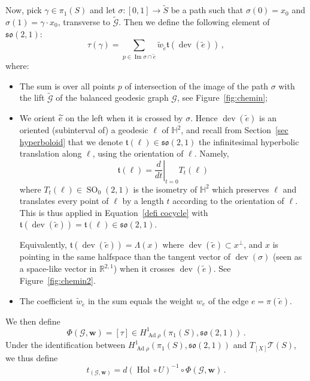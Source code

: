 \documentclass[11pt]{article}
\theoremstyle{definition}
\numberwithin{equation}{section}
\numberwithin{figure}{section}
\numberwithin{table}{section}
\newcommand{\Teich}{\mathcal{T}}
\newcommand{\Hyp}{\mathbb{H}}
\newcommand{\R}{{\mathbb R}}
\newcommand{\so}{\mathfrak{so}}
\DeclareMathOperator{\dev}{dev}
\DeclareMathOperator{\Ad}{Ad}
\DeclareMathOperator{\Hol}{Hol}
\DeclareMathOperator{\SO}{SO}
\DeclareMathOperator{\Imm}{Im}
\let\oldtilde\tilde
\renewcommand*{\tilde}[1]{\mathchoice{\widetilde{#1}}{\widetilde{#1}}{\oldtilde{#1}}{\oldtilde{#1}}}\let\oldhat\hat
\renewcommand*{\hat}[1]{\mathchoice{\widehat{#1}}{\widehat{#1}}{\oldhat{#1}}{\oldhat{#1}}}
\begin{document}
Now, pick $\gamma\in\pi_1(S)$ and let $\sigma:[0,1]\to\widetilde S$ be a path such that $\sigma(0)=x_0$ and $\sigma(1)=\gamma\cdot x_0$, transverse to $\widetilde{\mathcal{G}}$. Then we define the following element of $\so(2,1)$:
\begin{equation}\label{defi cocycle}
\tau(\gamma)=\sum_{p\in \Imm\sigma\cap \widetilde e} \widetilde w_{\widetilde e} \mathfrak t(\dev(\widetilde e))\,,
\end{equation}
where:
\begin{itemize}
\item The sum is over all points $p$ of intersection of the image of the path $\sigma$ with the lift $\widetilde{\mathcal{G}}$ of the balanced geodesic graph $\mathcal{G}$, see Figure~\ref{fig:chemin};
\item We orient $\tilde{e}$ on the left when it is crossed by $\sigma$. Hence $\dev(\widetilde e)$ is an oriented (subinterval of) a geodesic $\ell$ of $\Hyp^2$, and recall from Section~\ref{sec hyperboloid} that we denote $\mathfrak t(\ell)\in\so(2,1)$ the infinitesimal hyperbolic translation along $\ell$, using the orientation of $\ell$. Namely,
\[
\mathfrak t(\ell)=\left.\frac{d}{dt}\right|_{t=0}T_t(\ell)
\]
where $T_t(\ell)\in\SO_0(2,1)$ is the isometry of $\Hyp^2$ which preserves $\ell$ and translates every point of $\ell$ by a length $t$ according to the orientation of $\ell$. This is thus applied in Equation~\eqref{defi cocycle} with $\mathfrak t(\dev(\widetilde e))=\mathfrak t(\ell)\in \so(2,1)$.

Equivalently, $\mathfrak t(
\dev(\widetilde e))=\Lambda(x)$ where $\dev(\widetilde e)\subset x^\perp$, and $x$ is pointing in the same halfspace than the tangent vector of $\dev(\sigma)$ (seen as a space-like vector in $\R^{2,1}$) when it crosses $\dev(\widetilde e)$. See Figure~\ref{fig:chemin2}.
\item The coefficient $\widetilde w_{\widetilde e}$ in the sum equals the weight $w_e$ of the edge $e=\pi(\widetilde e)$.
\end{itemize}
We then define
\[
\Phi(\mathcal{G},\mathbf w)=[\tau]\in H^1_{\Ad\rho}(\pi_1(S),\so(2,1))\,.
\]
Under the identification between $H^1_{\Ad\rho}(\pi_1(S),\so(2,1))$ and $T_{[X]}\Teich(S)$, we thus define
\begin{equation}\label{eq defi variation teich}
t_{(\mathcal{G},\mathbf w)}=d(\Hol\circ U)^{-1}\circ \Phi(\mathcal{G},\mathbf w)\,.
\end{equation}
\end{document}
